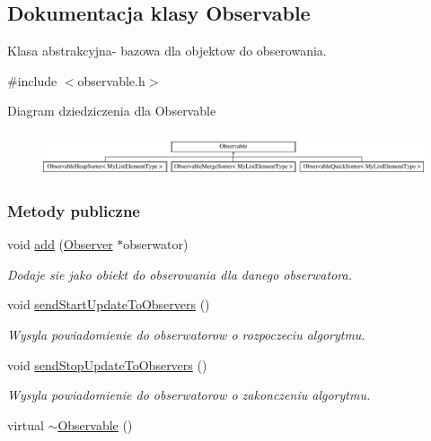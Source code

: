 \hypertarget{class_observable}{\subsection{Dokumentacja klasy Observable}
\label{class_observable}
}


Klasa abstrakcyjna-\/ bazowa dla objektow do obserowania.  




{\ttfamily \#include $<$observable.\-h$>$}

Diagram dziedziczenia dla Observable\begin{figure}[H]
\begin{center}
\leavevmode
\includegraphics[height=1.282932cm]{class_observable}
\end{center}
\end{figure}
\subsubsection*{Metody publiczne}
\begin{DoxyCompactItemize}
\item 
void \hyperlink{class_observable_a18e7700c59126dbeb97d24844c6ed131}{add} (\hyperlink{class_observer}{Observer} $\ast$obserwator)
\begin{DoxyCompactList}\small\item\em Dodaje sie jako obiekt do obserowania dla danego obserwatora. \end{DoxyCompactList}\item 
void \hyperlink{class_observable_a78df64057f152342a43f27979186a6ba}{send\-Start\-Update\-To\-Observers} ()
\begin{DoxyCompactList}\small\item\em Wysyla powiadomienie do obserwatorow o rozpoczeciu algorytmu. \end{DoxyCompactList}\item 
void \hyperlink{class_observable_a16f75ed1514a0cb7526b5a5d2b7ca7c6}{send\-Stop\-Update\-To\-Observers} ()
\begin{DoxyCompactList}\small\item\em Wysyla powiadomienie do obserwatorow o zakonczeniu algorytmu. \end{DoxyCompactList}\item 
virtual \hyperlink{class_observable_a42f551d4d64ffa48a2ea8d7f0a4e42d4}{$\sim$\-Observable} ()
\end{DoxyCompactItemize}
